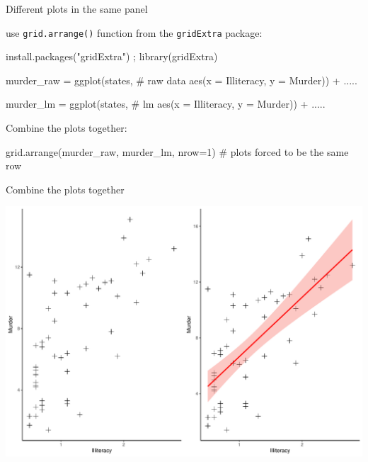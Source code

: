 \documentclass[
  ignorenonframetext,
]{beamer}
\newenvironment{Shaded}{\begin{snugshade}}{\end{snugshade}}
\newcommand{\AttributeTok}[1]{\textcolor[rgb]{0.00,0.34,0.68}{#1}}
\newcommand{\CommentTok}[1]{\textcolor[rgb]{0.54,0.53,0.53}{#1}}
\newcommand{\DecValTok}[1]{\textcolor[rgb]{0.69,0.50,0.00}{#1}}
\newcommand{\FunctionTok}[1]{\textcolor[rgb]{0.39,0.29,0.61}{#1}}
\newcommand{\NormalTok}[1]{\textcolor[rgb]{0.12,0.11,0.11}{#1}}
\newcommand{\OtherTok}[1]{\textcolor[rgb]{0.00,0.43,0.16}{#1}}
\newcommand{\SpecialCharTok}[1]{\textcolor[rgb]{0.24,0.68,0.91}{#1}}
\newcommand{\StringTok}[1]{\textcolor[rgb]{0.75,0.01,0.01}{#1}}
\begin{document}
\begin{frame}[fragile]{Different plots in the same panel}
\protect\hypertarget{different-plots-in-the-same-panel}{}
\small

use \texttt{grid.arrange()} function from the \texttt{gridExtra}
package:

\begin{Shaded}
\begin{Highlighting}[]
\FunctionTok{install.packages}\NormalTok{(}\StringTok{"gridExtra"}\NormalTok{) ; }\FunctionTok{library}\NormalTok{(gridExtra)}
\end{Highlighting}
\end{Shaded}

\begin{Shaded}
\begin{Highlighting}[]
\NormalTok{murder\_raw }\OtherTok{=} \FunctionTok{ggplot}\NormalTok{(states,  }\CommentTok{\# raw data}
               \FunctionTok{aes}\NormalTok{(}\AttributeTok{x =}\NormalTok{ Illiteracy, }\AttributeTok{y =}\NormalTok{ Murder)) }\SpecialCharTok{+}
\NormalTok{           .....}

\NormalTok{murder\_lm }\OtherTok{=} \FunctionTok{ggplot}\NormalTok{(states,  }\CommentTok{\# lm }
               \FunctionTok{aes}\NormalTok{(}\AttributeTok{x =}\NormalTok{ Illiteracy, }\AttributeTok{y =}\NormalTok{ Murder)) }\SpecialCharTok{+}
\NormalTok{           .....}
\end{Highlighting}
\end{Shaded}

Combine the plots together:

\begin{Shaded}
\begin{Highlighting}[]
\FunctionTok{grid.arrange}\NormalTok{(murder\_raw, murder\_lm, }
             \AttributeTok{nrow=}\DecValTok{1}\NormalTok{) }\CommentTok{\# plots forced to be the same row}
\end{Highlighting}
\end{Shaded}
\end{frame}

\begin{frame}{Combine the plots together}
\protect\hypertarget{combine-the-plots-together}{}
\small

\begin{center}\includegraphics[width=0.7\linewidth]{Practice_files/figure-beamer/unnamed-chunk-71-1} \end{center}
\end{frame}
\end{document}
